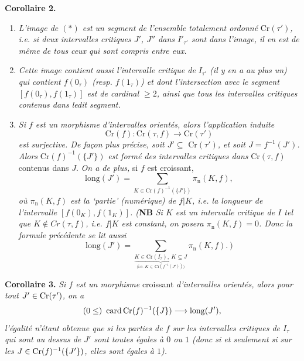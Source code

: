 \textbf{Corollaire 2.}
\begin{enumerate}
\item[\textit{a)}] \textit{L'image de $(*)$ est un segment de l'ensemble totalement ordonné} $\mathrm{Cr}(\tau')$\textit{, i.e. si deux intervalles critiques $J'$, $J''$ dans $I'_{\tau'}$ sont dans l'image, il en est de même de tous} %
\textit{ceux qui sont compris entre eux.}
\item[\textit{b)}] \textit{Cette image contient aussi l'intervalle critique de $I_{\tau'}$ (il y en a au plus un) qui contient $f(0_\tau)$ (resp. $f(1_\tau)$) et dont l'intersection avec le segment $[f(0_\tau),f(1_\tau)]$ est de cardinal $\geq 2$, ainsi que tous les intervalles critiques contenus dans ledit segment.}
\item[\textit{c)}] \textit{Si $f$ est un morphisme d'intervalles orientés, alors l'application induite}
\[
\mathrm{Cr}(f):\mathrm{Cr}(\tau,f)\longrightarrow\mathrm{Cr}(\tau')
\]
\textit{est surjective. De façon plus précise, soit $J'\subseteq$} $\mathrm{Cr}(\tau')$\textit{, et soit $J=f^{-1}(J')$. Alors} $\mathrm{Cr}(f)^{-1}(\{J'\})$ \textit{est formé des intervalles critiques dans} $\mathrm{Cr}(\tau,f)$ contenus dans $J$. \textit{On a de plus,} si $f$ est croissant, %
\[
\mathrm{long}(J')=\sum_{K\in\mathrm{Cr}(f)^{-1}(\{J'\})}\pi_{\mathrm{n}}(K,f),
\]
\textit{où $\pi_{\mathrm{n}}(K,f)$ est la `partie' (numérique) de $f|K$, i.e. la longueur de l'intervalle $[f(0_K),f(1_K)]$. (}\textbf{NB} \textit{Si $K$ est un intervalle critique de $I$ tel que $K\notin Cr(\tau,f)$, i.e. $f|K$ est constant, on posera $\pi_{\mathrm{n}}(K,f)=0$. Donc la formule précédente se lit aussi}
\[
\mathrm{long}(J')=\sum\limits_{\underbrace{K\in\mathrm{Cr}(I_\tau),\ K\subseteq J}_{\text{(i.e. }K\,\in\,\mathrm{Cr}(f^{-1}(J'))\text{)}}}\pi_{\mathrm{n}}(K,f).\ \textit{)}
\]
\end{enumerate}


\textbf{Corollaire 3.} \textit{Si $f$ est un morphisme} croissant \textit{d'intervalles orientés, alors pour tout $J' \in \mathrm{Cr}(\tau')$, on a}
\[
(0 \leq)\ \operatorname{card} \mathrm{Cr}(f)^{-1}(\{J\}) \longrightarrow \operatorname{long}(J'),
\] %
\textit{l'égalité n'étant obtenue que si les parties de $f$ sur les intervalles critiques de $I_\tau$ qui sont au dessus de $J'$ sont toutes égales à $0$ ou $1$ (donc si et seulement si sur les $J \in \mathrm{Cr}(f)^{-1}(\{J'\})$, elles sont égales à $1$).}

